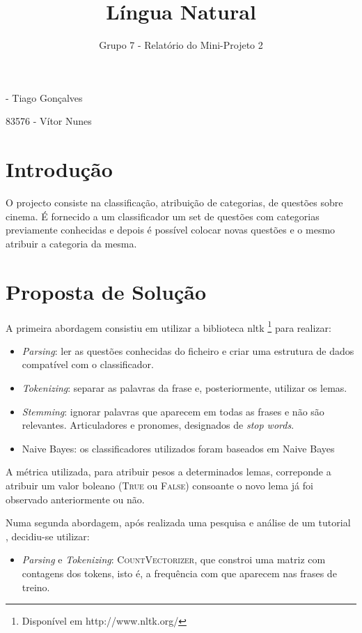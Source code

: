 \documentclass[12pt]{article}
\begin{document}
\title{\vspace{-3cm}Língua Natural}
\author{Grupo 7 - Relatório do Mini-Projeto 2}
\date{}

 - Tiago Gonçalves

83576 - Vítor Nunes

\section*{Introdução}
O projecto consiste na classificação, atribuição de categorias, de questões sobre cinema. É fornecido a um classificador um set de questões 
com categorias previamente conhecidas e depois é possível colocar novas questões e o mesmo atribuir a categoria da mesma.  

\section*{Proposta de Solução}
A primeira abordagem consistiu em utilizar a biblioteca nltk \footnote{Disponível em http://www.nltk.org/} para realizar:

\begin{itemize}
    \item{\textit{Parsing}: ler as questões conhecidas do ficheiro e criar uma estrutura de dados compatível com o classificador.}
    \item{\textit{Tokenizing}: separar as palavras da frase e, posteriormente, utilizar os lemas.}
    \item{\textit{Stemming}: ignorar palavras que aparecem em todas as frases e não são relevantes. Articuladores e pronomes, designados de \textit{stop words}.}
    \item{Naive Bayes: os classificadores utilizados foram baseados em Naive Bayes}
\end{itemize}

A métrica utilizada, para atribuir pesos a determinados lemas, correponde a atribuir um valor boleano (\textsc{True} ou \textsc{False}) consoante
o novo lema já foi observado anteriormente ou não.

Numa segunda abordagem, após realizada uma pesquisa e análise de um tutorial \cite{sklearn_tutorial}, decidiu-se utilizar:

\begin{itemize}
    \item{\textit{Parsing} e \textit{Tokenizing}: \textsc{CountVectorizer}, que constroi uma matriz com contagens dos tokens, isto é, a frequência com que aparecem nas frases de treino.}
\end{itemize}
\end{document}
